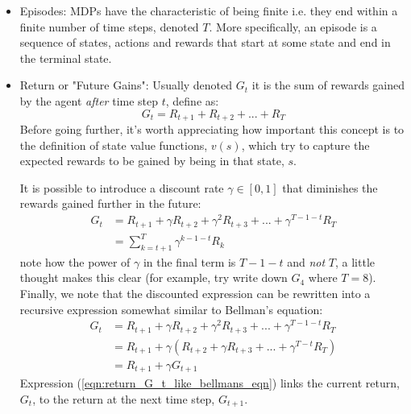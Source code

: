 \documentclass[a4paper,11pt]{article}
\begin{document}
\begin{itemize}
    \item Episodes:  MDPs have the characteristic of being finite i.e. they end within a finite number of time steps, denoted $T$.  More specifically, an episode is a sequence of states, actions and rewards that start at some state and end in the terminal state.
    \item Return or "Future Gains":  Usually denoted $G_t$ it is the sum of rewards gained by the agent {\it after} time step $t$, define as:
    \begin{equation} \label{eqn:return_G_t}
        G_t = R_{t+1} + R_{t+2} + ... + R_{T}
    \end{equation}
    Before going further, it's worth appreciating how important this concept is to the definition of state value functions, $v(s)$, which try to capture the expected rewards to be gained by being in that state, $s$.

    It is possible to introduce a discount rate $\gamma \in [0,1]$ that diminishes the rewards gained further in the future:
    \begin{equation} \label{eqn:return_G_t_discounted}
    \begin{split}
        G_t &= R_{t+1} + \gamma R_{t+2} + \gamma^2 R_{t+3} + ... + \gamma^{T-1-t} R_{T} \\
        &= \sum_{k=t+1}^{T} \gamma^{k-1-t}R_k
    \end{split}
    \end{equation}
    note how the power of $\gamma$ in the final term is $T-1-t$ and {\it not} $T$, a little thought makes this clear (for example, try write down $G_4$ where $T=8$).  Finally, we note that the discounted expression can be rewritten into a recursive expression somewhat similar to Bellman's equation:
    \begin{equation} \label{eqn:return_G_t_like_bellmans_eqn}
    \begin{split}
        G_t &= R_{t+1} + \gamma R_{t+2} + \gamma^2 R_{t+3} + ... + \gamma^{T-1-t} R_{T} \\
        &= R_{t+1} + \gamma( R_{t+2} + \gamma R_{t+3} + ... + \gamma^{T-t} R_{T}) \\
        &= R_{t+1} + \gamma G_{t+1}
    \end{split}
    \end{equation}
    Expression (\ref{eqn:return_G_t_like_bellmans_eqn}) links the current return, $G_t$, to the return at the next time step, $G_{t+1}$.
\end{itemize}
\end{document}

